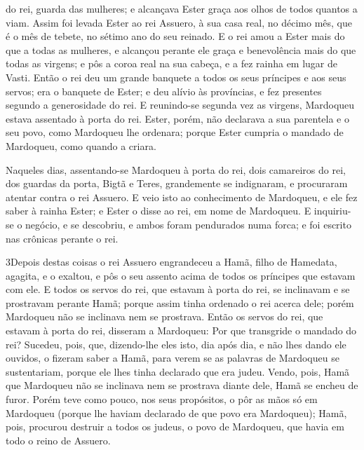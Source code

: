 do rei, guarda das mulheres; e alcançava Ester graça aos olhos de
todos quantos a viam. Assim foi levada Ester ao rei Assuero,
à sua casa real, no décimo mês, que é o mês de tebete, no sétimo ano
do seu reinado. E o rei amou a Ester mais do que a todas as
mulheres, e alcançou perante ele graça e benevolência mais do que
todas as virgens; e pôs a coroa real na sua cabeça, e a fez rainha
em lugar de Vasti. Então o rei deu um grande banquete a todos
os seus príncipes e aos seus servos; era o banquete de Ester; e deu
alívio às províncias, e fez presentes segundo a generosidade do rei.
E reunindo-se segunda vez as virgens, Mardoqueu estava
assentado à porta do rei. Ester, porém, não declarava a sua
parentela e o seu povo, como Mardoqueu lhe ordenara; porque Ester
cumpria o mandado de Mardoqueu, como quando a criara.

Naqueles dias, assentando-se Mardoqueu à porta do rei, dois
camareiros do rei, dos guardas da porta, Bigtã e Teres, grandemente
se indignaram, e procuraram atentar contra o rei Assuero. E
veio isto ao conhecimento de Mardoqueu, e ele fez saber à rainha
Ester; e Ester o disse ao rei, em nome de Mardoqueu. E
inquiriu-se o negócio, e se descobriu, e ambos foram pendurados numa
forca; e foi escrito nas crônicas perante o rei.

\medskip

\lettrine{3} Depois destas coisas o rei Assuero engrandeceu a
Hamã, filho de Hamedata, agagita, e o exaltou, e pôs o seu assento
acima de todos os príncipes que estavam com ele. E todos os
servos do rei, que estavam à porta do rei, se inclinavam e se
prostravam perante Hamã; porque assim tinha ordenado o rei acerca
dele; porém Mardoqueu não se inclinava nem se prostrava. Então
os servos do rei, que estavam à porta do rei, disseram a Mardoqueu:
Por que transgride o mandado do rei? Sucedeu, pois, que,
dizendo-lhe eles isto, dia após dia, e não lhes dando ele ouvidos, o
fizeram saber a Hamã, para verem se as palavras de Mardoqueu se
sustentariam, porque ele lhes tinha declarado que era judeu.
Vendo, pois, Hamã que Mardoqueu não se inclinava nem se
prostrava diante dele, Hamã se encheu de furor. Porém teve como
pouco, nos seus propósitos, o pôr as mãos só em Mardoqueu (porque
lhe haviam declarado de que povo era Mardoqueu); Hamã, pois,
procurou destruir a todos os judeus, o povo de Mardoqueu, que havia
em todo o reino de Assuero.

